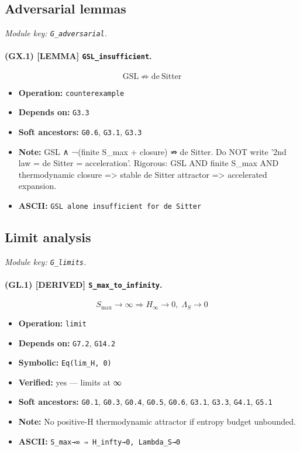 \documentclass[11pt,a4paper]{article}
\theoremstyle{remark}\newtheorem*{caution}{Caution}
\newcommand{\tagbox}[1]{\textsc{[#1]}}
\begin{document}
\subsection{Adversarial lemmas}
\textit{Module key: \texttt{G\_adversarial}.}
\paragraph{(GX.1) \tagbox{LEMMA} \texttt{GSL\_insufficient}.}
\begin{equation}
\mathrm{GSL}\not\Rightarrow\mathrm{de\ Sitter}
\tag{GX.1}
\end{equation}
\begin{itemize}\setlength{\itemsep}{0.12em}
\item \textbf{Operation:} \texttt{counterexample}
\item \textbf{Depends on:} \texttt{G3.3}
\item \textbf{Soft ancestors:} \texttt{G0.6}, \texttt{G3.1}, \texttt{G3.3}
\item \textbf{Note:} GSL ∧ ¬(finite S\_max + closure) ⇏ de Sitter. Do NOT write '2nd law = de Sitter = acceleration'. Rigorous: GSL AND finite S\_max AND thermodynamic closure => stable de Sitter attractor => accelerated expansion.
\item \textbf{ASCII:} \texttt{GSL alone insufficient for de Sitter}
\end{itemize}
\subsection{Limit analysis}
\textit{Module key: \texttt{G\_limits}.}
\paragraph{(GL.1) \tagbox{DERIVED} \texttt{S\_max\_to\_infinity}.}
\begin{equation}
S_{\max}\to\infty\Rightarrow H_\infty\to 0,\;\Lambda_S\to 0
\tag{GL.1}
\end{equation}
\begin{itemize}\setlength{\itemsep}{0.12em}
\item \textbf{Operation:} \texttt{limit}
\item \textbf{Depends on:} \texttt{G7.2}, \texttt{G14.2}
\item \textbf{Symbolic:} \texttt{Eq(lim\_H, 0)}
\item \textbf{Verified:} yes --- limits at ∞
\item \textbf{Soft ancestors:} \texttt{G0.1}, \texttt{G0.3}, \texttt{G0.4}, \texttt{G0.5}, \texttt{G0.6}, \texttt{G3.1}, \texttt{G3.3}, \texttt{G4.1}, \texttt{G5.1}
\item \textbf{Note:} No positive-H thermodynamic attractor if entropy budget unbounded.
\item \textbf{ASCII:} \texttt{S\_max→∞ ⇒ H\_infty→0, Lambda\_S→0}
\end{itemize}
\end{document}
